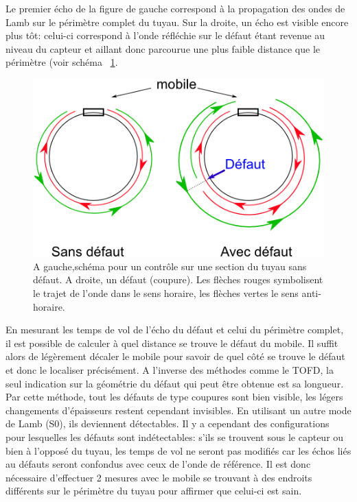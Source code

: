 \documentclass[twoside]{article}
\begin{document}
\begin{multicols}{2}
Le premier écho de la figure de gauche correspond à la propagation des ondes de Lamb sur le périmètre complet du tuyau. Sur la droite, un écho est visible encore plus tôt: celui-ci correspond à l'onde réfléchie sur le défaut étant revenue au niveau du capteur et aillant donc parcourue une plus faible distance que le périmètre (voir schéma ~\ref{schema1}. 

\begin{figure}[H]
\centering
\includegraphics[scale=0.5]{./images/schema_comp_lamb.png}
\caption{\label{schema1} A gauche,schéma pour un contrôle sur une section du tuyau sans défaut. A droite, un défaut (coupure). Les flèches rouges symbolisent le trajet de l'onde dans le sens horaire, les flèches vertes le sens anti-horaire.}
\end{figure}

En mesurant les temps de vol de l'écho du défaut et celui du périmètre complet, il est possible de calculer à quel distance se trouve le défaut du mobile. Il suffit alors de légèrement décaler le mobile pour savoir de quel côté se trouve le défaut et donc le localiser précisément. A l'inverse des méthodes comme le TOFD, la seul indication sur la géométrie du défaut qui peut être obtenue est sa longueur. Par cette méthode, tout les défauts de type coupures sont bien visible, les légers changements d'épaisseurs restent cependant invisibles. En utilisant un autre mode de Lamb (S0), ils deviennent détectables.
\bigskip
Il y a cependant des configurations pour lesquelles les défauts sont indétectables: s'ils se trouvent sous le capteur ou bien à l'opposé du tuyau, les temps de vol ne seront pas modifiés car les échos liés au défauts seront confondus avec ceux de l'onde de référence. Il est donc nécessaire d'effectuer 2 mesures avec le mobile se trouvant à des endroits différents sur le périmètre du tuyau pour affirmer que celui-ci est sain.




\end{multicols}
\end{document}
